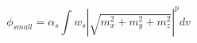 \vspace{-0.1cm}
\begin{equation}
    \phi_{small} = \alpha_s \int w_s\left|\sqrt{m_x^2+m_y^2+m_z^2}\right|^p dv
\end{equation}

